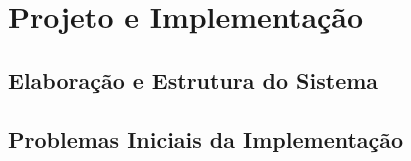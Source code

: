 \chapter{Projeto e Implementação}

\section{Elaboração e Estrutura do Sistema}
\section{Problemas Iniciais da Implementação}